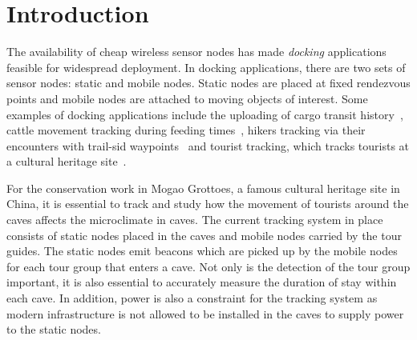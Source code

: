 \documentclass[twoside,twocolumn]{article}
\begin{document}




\articleType{}

\maketitle



\section{Introduction} 
\label{sec:introduction}
The availability of cheap wireless sensor nodes has made \emph{docking} applications~\citep{Dutta2008Practical} 
feasible for widespread deployment. In docking applications, there are two sets of sensor nodes: static and mobile
nodes. Static nodes are placed at fixed rendezvous points and mobile nodes are attached to moving objects of interest.
Some examples of docking applications include the uploading of cargo transit history~\citep{malinowski2007cargonet}, 
cattle movement tracking during feeding times~\citep{wark2007model}, hikers tracking via their encounters 
with trail-sid waypoints~\citep{huang2005cenwits} and tourist tracking, which tracks tourists at a cultural heritage 
site~\citep{ming2008wireless}.

For the conservation work in Mogao Grottoes, a famous cultural heritage site in China, it is essential to track and 
study how the movement of tourists around the caves affects the microclimate in caves. The current tracking system
in place consists of static nodes placed in the caves and mobile nodes carried by the tour guides. The static nodes
emit beacons which are picked up by the mobile nodes for each tour group that enters a cave. Not only is the 
detection of the tour group important, it is also essential to accurately measure the duration of stay within each
cave. In addition, power is also a constraint for the tracking system as modern infrastructure is not allowed to be
installed in the caves to supply power to the static nodes.
\end{document}
